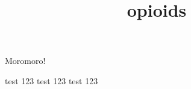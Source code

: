\documentclass[10pt]{article}
\begin{document}
\title{opioids }
\maketitle

Moromoro!

test 123 test 123 test 123
\end{document}
